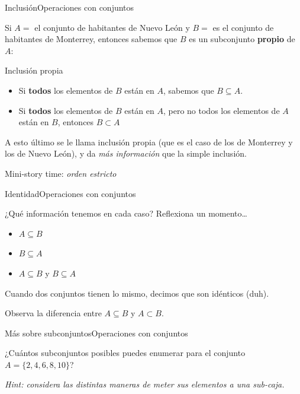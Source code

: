 \documentclass[spanish, c]{beamer}
\begin{document}
\begin{frame}{Inclusión}{Operaciones con conjuntos}

    Si $A = $ el conjunto de habitantes de Nuevo León y $B = $ es el conjunto de habitantes de Monterrey, entonces sabemos que $B$ es un \alert{subconjunto \textbf{propio}} de $A$: \pause

    \begin{block}{Inclusión propia}
        \begin{itemize}
            \item Si \textbf{todos} los elementos de $B$ están en $A$, sabemos que $B \subseteq A$.
            \item Si \textbf{todos} los elementos de $B$ están en $A$, pero no todos los elementos de $A$ están en $B$, entonces $B \subset A$
        \end{itemize}        
    \end{block}

    A esto último se le llama inclusión propia (que es el caso de los de Monterrey y los de Nuevo León), y da \textit{más información} que la simple inclusión.

    \bigskip
    
    {\Large Mini-story time: \textit{orden estricto}}

\end{frame}

\begin{frame}{Identidad}{Operaciones con conjuntos}

    ¿Qué información tenemos en cada caso? Reflexiona un momento\dots \pause

    \bigskip

    \begin{itemize}[<+->]
        \item $A \subseteq B$
        \item $B \subseteq A$
        \item $A \subseteq B$ y $B \subseteq A$
    \end{itemize} \pause

    Cuando dos conjuntos tienen lo mismo, decimos que son \alert{idénticos} {\tiny (duh)}.

    \bigskip \pause

    Observa la diferencia entre $A \subseteq B$ y $A \subset B$.
\end{frame}

\begin{frame}{Más sobre subconjuntos}{Operaciones con conjuntos}
    \begin{center}
        {\LARGE
        ¿Cuántos subconjuntos posibles puedes enumerar para el conjunto $A = \{2, 4, 6, 8, 10\}$?}
    
        \bigskip

        \textit{Hint: considera las distintas maneras de meter sus elementos a una sub-caja.}
    \end{center}
\end{frame}
\end{document}
